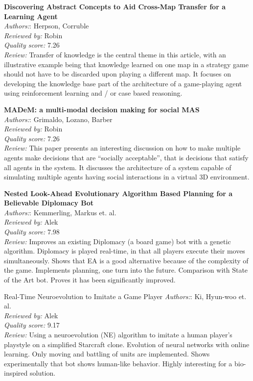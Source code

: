 \textbf{Discovering Abstract Concepts to Aid Cross-Map Transfer for a Learning Agent}\\
\textit{Authors:}: Herpson, Corruble\\
\textit{Reviewed by:} Robin\\
\textit{Quality score:} 7.26\\
\textit{Review:} Transfer of knowledge is the central theme in this article, with an illustrative example being that knowledge learned on one map in a strategy game should not have to be discarded upon playing a different map. It focuses on developing the knowledge base part of the architecture of a game-playing agent using reinforcement learning and / or case based reasoning.

\textbf{MADeM: a multi-modal decision making for social MAS}\\
\textit{Authors:}: Grimaldo, Lozano, Barber\\
\textit{Reviewed by:} Robin\\
\textit{Quality score:} 7.26\\
\textit{Review:} This paper presents an interesting discussion on how to make multiple agents make decisions that are “socially acceptable”, that is decisions that satisfy all agents in the system. It discusses the architecture of a system capable of simulating multiple agents having social interactions in a virtual 3D environment. 

\textbf{Nested Look-Ahead Evolutionary Algorithm Based Planning for a Believable Diplomacy Bot}\\
\textit{Authors:}: Kemmerling, Markus et. al.\\
\textit{Reviewed by:} Alek	\\
\textit{Quality score:} 7.98\\
\textit{Review:} Improves an existing Diplomacy (a board game) bot with a genetic algorithm. Diplomacy is played real-time, in that all players execute their moves simultaneously. Shows that EA is a good alternative because of the complexity of the game. Implements planning, one turn into the future. Comparison with State of the Art bot. Proves it has been significantly improved.

Real-Time Neuroevolution to Imitate a Game Player
\textit{Authors:}: Ki, Hyun-woo et. al.\\
\textit{Reviewed by:} Alek\\
\textit{Quality score:} 9.17\\
\textit{Review:} Using a neuroevolution (NE) algorithm to imitate a human player’s playstyle on a simplified Starcraft clone. Evolution of neural networks with online learning. Only moving and battling of units are implemented. Shows experimentally that bot shows human-like behavior. Highly interesting for a bio-inspired solution.


